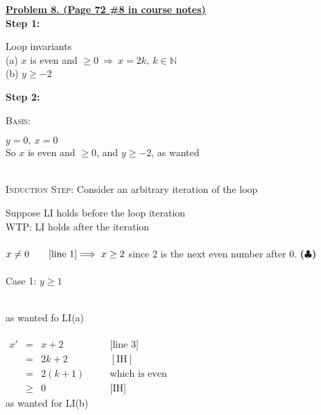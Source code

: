 \documentclass[12pt]{article}
\newcommand{\N}{\mathbb{N}}
\newcommand\myalign[1]{\alignShortstack{\strut#1\strut}}
\begin{document}
{\LARGE \noindent \underline{\textbf{Problem 8. (Page 72 \#8 in course notes)}}}\\

\noindent \textbf{Step 1:}

\hfill\begin{minipage}{\dimexpr\textwidth-10mm}
	Loop invariants\\
	\hspace*{10 pt} (a) $x$ is even and $\geq 0$$\ \Longrightarrow \ x = 2k, \ k\in \N$\\
		\hspace*{10 pt} (b) $y \geq -2$\\
\end{minipage}
\textbf{Step 2:} %

\hfill\begin{minipage}{\dimexpr\textwidth-10mm}
	\textsc{Basis:} 

	\hfill\begin{minipage}{\dimexpr\textwidth-10mm}
		$y = 0, \ x = 0$\\
		So $x$ is even and $\geq 0$, and $y \geq -2$, as wanted
	\end{minipage}\\

	\textsc{Induction Step:} Consider an arbitrary iteration of the loop

	\hfill\begin{minipage}{\dimexpr\textwidth-10mm}
		Suppose LI holds before the loop iteration \qquad [IH]\\
		WTP: LI holds after the iteration
		\\\\
		$x \not = 0 \qquad \text{[line 1]}\\
			\Longrightarrow \ x \geq 2$ since 2 is the next even number after 0. \qquad \textbf{($\clubsuit $)}
		\\\\
		Case 1: $y \geq 1$

		\hfill\begin{minipage}{\dimexpr\textwidth-10mm}
			\myalign{
				y'\ &=\ y - 3\qquad \text{[line 3]}\\
				&\geq\ 1 - 3\qquad [\text{line 2}]\\
				&=\ -2
			}\\
			as wanted fo LI(a)
			\\\\
			$\begin{array}{lcll}
					x' & =    & x+2 \qquad \qquad & \text{[line 3]}      \\
					   & =    & 2k + 2            & [\text{IH}]          \\
					   & =    & 2(k+1)            & \text{which is even} \\
					   & \geq & 0                 & \text{[IH]}
				\end{array}$\\
			as wanted for LI(b)\\


\end{minipage}
\end{minipage}
\end{minipage}
\end{document}

